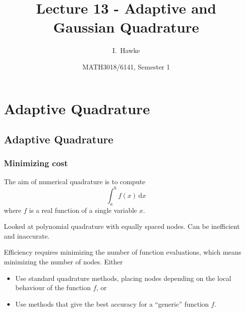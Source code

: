 \documentclass{beamer}
\title[Lecture 13] %
{Lecture 13 - Adaptive and Gaussian Quadrature}
\author[I. Hawke] %
{I.~Hawke}
\institute[University of Southampton] %
{
  School of Mathematics, \\
  University of Southampton, UK
}
\date[Semester 1] %
{MATH3018/6141, Semester 1}
\begin{document}
\begin{frame}
  \titlepage
\end{frame}

\section{Adaptive Quadrature}

\subsection{Adaptive Quadrature}

\begin{frame}
  \frametitle{Minimizing cost}

  The aim of numerical quadrature is to compute
  \begin{equation*}
    \int_a^b f(x) \, \text{d}x
  \end{equation*}
  where $f$ is a real function of a single variable $x$.

  \vspace{1ex}

  Looked at polynomial quadrature with equally spaced nodes. Can be
  inefficient and inaccurate.  \pause

  \vspace{1ex}

  Efficiency requires minimizing the number of function evaluations,
  which means minimizing the number of nodes.  Either
  \begin{itemize}
  \item Use standard quadrature methods, placing nodes depending on
    the local behaviour of the function $f$, or \pause
  \item Use methods that give the best accuracy for a ``generic''
    function $f$.
  \end{itemize}

\end{frame}
\end{document}

